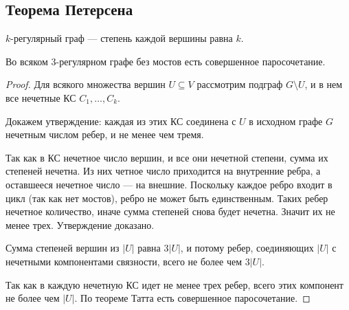 \subsection{Теорема Петерсена}

\begin{defn}
    $k$-регулярный граф --- степень каждой вершины равна $k$.
\end{defn}

\begin{theorem}[Петерсен, 1891]
    Во всяком $3$-регулярном графе без мостов есть совершенное паросочетание.
\end{theorem}

\begin{proof}
    Для всякого множества вершин $U \subseteq V$ рассмотрим подграф $G \setminus U$, и в нем все нечетные КС $C_1, \ldots, C_k$.

    Докажем утверждение: каждая из этих КС соединена с $U$ в исходном графе $G$ нечетным числом ребер, и не менее чем тремя.

    Так как в КС нечетное число вершин, и все они нечетной степени, сумма их степеней нечетна. Из них четное число приходится на внутренние ребра, а оставшееся нечетное число --- на внешние. Поскольку каждое ребро входит в цикл (так как нет мостов), ребро не может быть единственным. Таких ребер нечетное количество, иначе сумма степеней снова будет нечетна. Значит их не менее трех. Утверждение доказано.
    
    Сумма степеней вершин из $|U|$ равна $3|U|$, и потому ребер, соединяющих $|U|$ с нечетными компонентами связности, всего не более чем $3|U|$.
    
    Так как в каждую нечетную КС идет не менее трех ребер, всего этих компонент не более чем $|U|$. По теореме Татта есть совершенное паросочетание.
\end{proof}